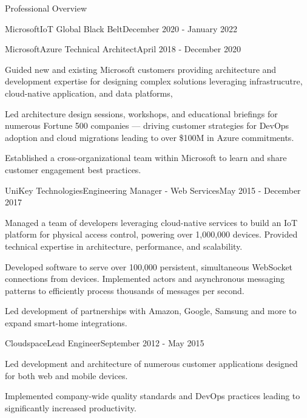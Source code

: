 \documentclass{resume} %
\begin{document}
\begin{rSection}{Professional Overview}
\begin{rNewRole}{Microsoft}{IoT Global Black Belt}{December 2020 - January 2022}
  \end{rNewRole}

  \begin{rNewRole}{Microsoft}{Azure Technical Architect}{April 2018 - December 2020}
      
    \item Guided new and existing Microsoft customers providing architecture and development expertise for designing complex solutions leveraging infrastrucutre, cloud-native application, and data platforms,
    \item Led architecture design sessions, workshops, and educational briefings for numerous Fortune 500 companies --- driving customer strategies for DevOps adoption and cloud migrations leading to over \$100M in Azure commitments.
    \item Established a cross-organizational team within Microsoft to learn and share customer engagement best practices.
    
  \end{rNewRole}
  
  
  \begin{rNewRole}{UniKey Technologies}{Engineering Manager - Web Services}{May 2015 - December 2017}
    
    \item Managed a team of developers leveraging cloud-native services to build an IoT platform for physical access control, powering over 1,000,000 devices.  Provided technical expertise in architecture, performance, and scalability.
    \item Developed software to serve over 100,000 persistent, simultaneous WebSocket connections from devices. Implemented actors and asynchronous messaging patterns to efficiently process thousands of messages per second.
    \item Led development of partnerships with Amazon, Google, Samsung and more to expand smart-home integrations.
    
  \end{rNewRole}
  
  
  \begin{rNewRole}{Cloudspace}{Lead Engineer}{September 2012 - May 2015}
    
    \item Led development and architecture of numerous customer applications designed for both web and mobile devices.
    \item Implemented company-wide quality standards and DevOps practices leading to significantly increased productivity.
    

\end{rNewRole}
\end{rSection}
\end{document}
